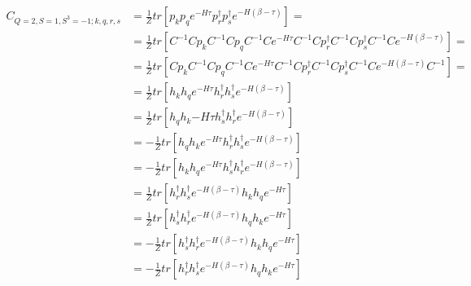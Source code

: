 \begin{equation}
  \begin{aligned}
    C_{Q=2,S=1,S^3=-1;k,q,r,s} &= \frac{1}{Z}tr\left[p_kp_qe^{-H\tau}p^\dagger_rp^\dagger_se^{-H\left(\beta-\tau\right)}\right] = 
    \\
    &= \frac{1}{Z}tr\left[C^{-1}Cp_kC^{-1}Cp_qC^{-1}Ce^{-H\tau}C^{-1}Cp^\dagger_rC^{-1}Cp^\dagger_sC^{-1}Ce^{-H\left(\beta-\tau\right)}\right] = 
    \\
    &= \frac{1}{Z}tr\left[Cp_kC^{-1}Cp_qC^{-1}Ce^{-H\tau}C^{-1}Cp^\dagger_rC^{-1}Cp^\dagger_sC^{-1}Ce^{-H\left(\beta-\tau\right)}C^{-1}\right] = 
    \\
    &= \frac{1}{Z}tr\left[h_kh_qe^{-H\tau}h^\dagger_rh^\dagger_se^{-H\left(\beta-\tau\right)}\right]
    \\
    &= \frac{1}{Z}tr\left[h_qh_k{-H\tau}h^\dagger_sh^\dagger_re^{-H\left(\beta-\tau\right)}\right]
    \\
    &= - \frac{1}{Z}tr\left[h_qh_ke^{-H\tau}h^\dagger_rh^\dagger_se^{-H\left(\beta-\tau\right)}\right]
    \\
    &= - \frac{1}{Z}tr\left[h_kh_qe^{-H\tau}h^\dagger_sh^\dagger_re^{-H\left(\beta-\tau\right)}\right]
    \\
    &= \frac{1}{Z}tr\left[h^\dagger_rh^\dagger_se^{-H\left(\beta-\tau\right)}h_kh_qe^{-H\tau}\right]
    \\
    &= \frac{1}{Z}tr\left[h^\dagger_sh^\dagger_re^{-H\left(\beta-\tau\right)}h_qh_ke^{-H\tau}\right]
    \\
    &= - \frac{1}{Z}tr\left[h^\dagger_sh^\dagger_re^{-H\left(\beta-\tau\right)}h_kh_qe^{-H\tau}\right]
    \\
    &= - \frac{1}{Z}tr\left[h^\dagger_rh^\dagger_se^{-H\left(\beta-\tau\right)}h_qh_ke^{-H\tau}\right]
    \\
  \end{aligned}
\end{equation}


